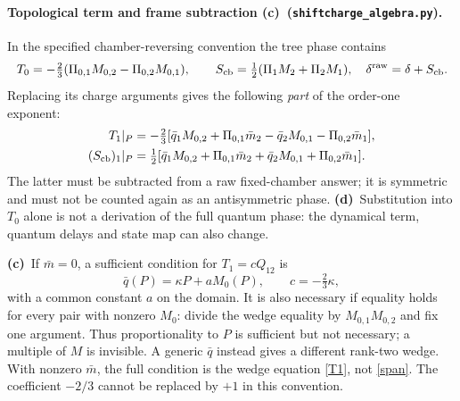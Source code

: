 \documentclass[11pt,a4paper]{article}
\newcommand{\C}{\textbf{(c)}\ }
\newcommand{\D}{\textbf{(d)}\ }
\newcommand{\file}[1]{\nolinkurl{#1}}
\newcommand{\alg}{\file{shiftcharge_algebra.py}}
\begin{document}
\paragraph{Topological term and frame subtraction \C (\alg).}
In the specified chamber-reversing convention the tree phase contains
\begin{equation}
 T_0=-\tfrac23(\Pi_{0,1}M_{0,2}-\Pi_{0,2}M_{0,1}),\qquad
 S_{\rm cb}=\tfrac12(\Pi_1M_2+\Pi_2M_1),\quad
 \delta^{\rm raw}=\delta+S_{\rm cb}.
\end{equation}
Replacing its charge arguments gives the following \emph{part} of the
order-one exponent:
\begin{align}
 T_1|_P&=-\tfrac23[\bar q_1M_{0,2}+\Pi_{0,1}\bar m_2
                  -\bar q_2M_{0,1}-\Pi_{0,2}\bar m_1],\label{T1}\\
 (S_{\rm cb})_1|_P&=\tfrac12[\bar q_1M_{0,2}+\Pi_{0,1}\bar m_2
                  +\bar q_2M_{0,1}+\Pi_{0,2}\bar m_1].\label{S1}
\end{align}
The latter must be subtracted from a raw fixed-chamber answer; it is symmetric
and must not be counted again as an antisymmetric phase.
\D Substitution into $T_0$ alone is not a derivation of the full quantum phase:
the dynamical term, quantum delays and state map can also change.

\C If $\bar m=0$, a sufficient condition for $T_1=cQ_{12}$ is
\begin{equation}
 \bar q(P)=\kappa P+aM_0(P),\qquad c=-\tfrac23\kappa,\label{span}
\end{equation}
with a common constant $a$ on the domain. It is also necessary if equality
holds for every pair with nonzero $M_0$: divide the wedge equality by
$M_{0,1}M_{0,2}$ and fix one argument. Thus proportionality to $P$ is
sufficient but not necessary; a multiple of $M$ is invisible. A generic
$\bar q$ instead gives a different rank-two wedge. With nonzero $\bar m$,
the full condition is the wedge equation \eqref{T1}, not \eqref{span}.
The coefficient $-2/3$ cannot be replaced by $+1$ in this convention.
\end{document}
